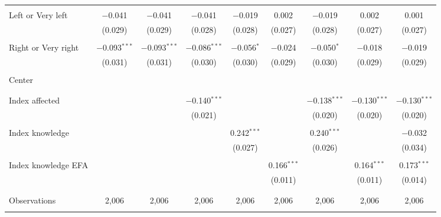 \begin{tabular}{@{\extracolsep{5pt}}lcccccccc}
  & & & & & & & & \\ 
 Left or Very left & $-$0.041 & $-$0.041 & $-$0.041 & $-$0.019 & 0.002 & $-$0.019 & 0.002 & 0.001 \\ 
  & (0.029) & (0.029) & (0.028) & (0.028) & (0.027) & (0.028) & (0.027) & (0.027) \\ 
  & & & & & & & & \\ 
 Right or Very right & $-$0.093$^{***}$ & $-$0.093$^{***}$ & $-$0.086$^{***}$ & $-$0.056$^{*}$ & $-$0.024 & $-$0.050$^{*}$ & $-$0.018 & $-$0.019 \\ 
  & (0.031) & (0.031) & (0.030) & (0.030) & (0.029) & (0.030) & (0.029) & (0.029) \\ 
  & & & & & & & & \\ 
 Center &  &  &  &  &  &  &  &  \\ 
  &  &  &  &  &  &  &  &  \\ 
  & & & & & & & & \\ 
 Index affected &  &  & $-$0.140$^{***}$ &  &  & $-$0.138$^{***}$ & $-$0.130$^{***}$ & $-$0.130$^{***}$ \\ 
  &  &  & (0.021) &  &  & (0.020) & (0.020) & (0.020) \\ 
  & & & & & & & & \\ 
 Index knowledge &  &  &  & 0.242$^{***}$ &  & 0.240$^{***}$ &  & $-$0.032 \\ 
  &  &  &  & (0.027) &  & (0.026) &  & (0.034) \\ 
  & & & & & & & & \\ 
 Index knowledge EFA &  &  &  &  & 0.166$^{***}$ &  & 0.164$^{***}$ & 0.173$^{***}$ \\ 
  &  &  &  &  & (0.011) &  & (0.011) & (0.014) \\ 
  & & & & & & & & \\ 
\hline \\[-1.8ex] 

Observations & 2,006 & 2,006 & 2,006 & 2,006 & 2,006 & 2,006 & 2,006 & 2,006 \\ 
\hline 
\hline \\[-1.8ex] 
\end{tabular} 
